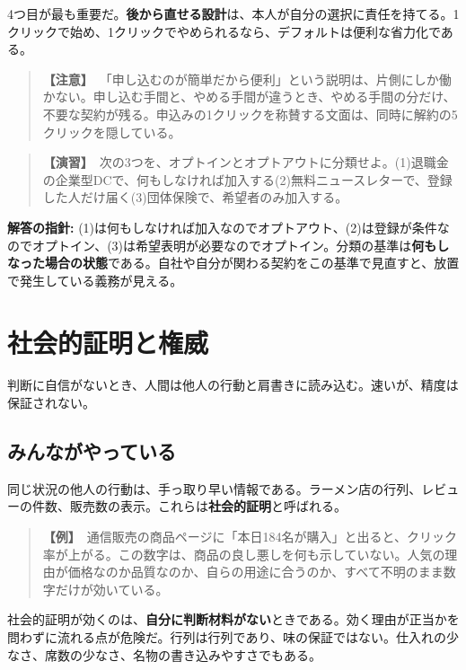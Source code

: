 \documentclass{article}
\begin{document}
4つ目が最も重要だ。\textbf{後から直せる設計}は、本人が自分の選択に責任を持てる。1クリックで始め、1クリックでやめられるなら、デフォルトは便利な省力化である。

\begin{quote}
\textbf{【注意】}\ 「申し込むのが簡単だから便利」という説明は、片側にしか働かない。申し込む手間と、やめる手間が違うとき、やめる手間の分だけ、不要な契約が残る。申込みの1クリックを称賛する文面は、同時に解約の5クリックを隠している。
\end{quote}

\begin{quote}
\textbf{【演習】}\ 次の3つを、オプトインとオプトアウトに分類せよ。(1)退職金の企業型DCで、何もしなければ加入する(2)無料ニュースレターで、登録した人だけ届く(3)団体保険で、希望者のみ加入する。
\end{quote}

\textbf{解答の指針:} (1)は何もしなければ加入なのでオプトアウト、(2)は登録が条件なのでオプトイン、(3)は希望表明が必要なのでオプトイン。分類の基準は\textbf{何もしなった場合の状態}である。自社や自分が関わる契約をこの基準で見直すと、放置で発生している義務が見える。

\section{社会的証明と権威}

判断に自信がないとき、人間は他人の行動と肩書きに読み込む。速いが、精度は保証されない。

\subsection{みんながやっている}

同じ状況の他人の行動は、手っ取り早い情報である。ラーメン店の行列、レビューの件数、販売数の表示。これらは\textbf{社会的証明}と呼ばれる。

\begin{quote}
\textbf{【例】}\ 通信販売の商品ページに「本日184名が購入」と出ると、クリック率が上がる。この数字は、商品の良し悪しを何も示していない。人気の理由が価格なのか品質なのか、自らの用途に合うのか、すべて不明のまま数字だけが効いている。
\end{quote}

社会的証明が効くのは、\textbf{自分に判断材料がない}ときである。効く理由が正当かを問わずに流れる点が危険だ。行列は行列であり、味の保証ではない。仕入れの少なさ、席数の少なさ、名物の書き込みやすさでもある。
\end{document}
